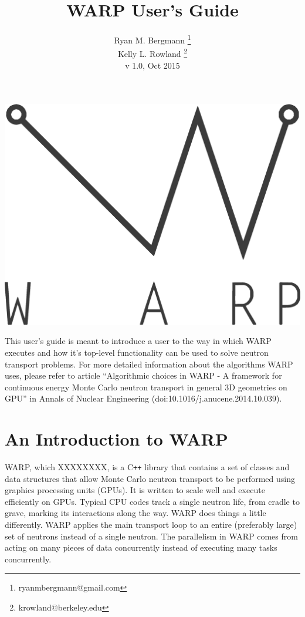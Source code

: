 \documentclass[twoside,a4paper]{refart}
\title{WARP User's Guide}
\author{Ryan M. Bergmann \thanks{ryanmbergmann@gmail.com} \\
Kelly L. Rowland \thanks{krowland@berkeley.edu}\\
v 1.0,  Oct 2015}
\date{}
\begin{document}
\maketitle

%
%

\includegraphics[width=\linewidth]{graphics/warp-vec.eps}

\vspace*{\fill} %

This user's guide is meant to introduce a user to the way in which WARP executes and how it's top-level functionality can be used to solve neutron transport problems.  For more detailed information about the algorithms WARP uses, please refer to article ``Algorithmic choices in WARP - A framework for continuous energy
Monte Carlo neutron transport in general 3D geometries on GPU'' in Annals of Nuclear Engineering (doi:10.1016/j.anucene.2014.10.039).

\vfill


\newpage
\tableofcontents
\newpage



\section{An Introduction to WARP}

WARP, which XXXXXXXX, is a C\texttt{++} library that contains a set of classes and data structures that allow Monte Carlo neutron transport to be performed using graphics processing units (GPUs).  It is written to scale well and execute efficiently on GPUs.  Typical CPU codes track a single neutron life, from cradle to grave, marking its interactions along the way.  WARP does things a little differently.  WARP applies the main transport loop to an entire (preferably large) set of neutrons instead of a single neutron.  The parallelism in WARP comes from acting on many pieces of data concurrently instead of executing many tasks concurrently.
\end{document}
